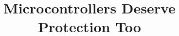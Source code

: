 \documentclass[letterpaper,twocolumn,10pt]{article}
\begin{document}
\date{}

\title{\Large \bf Microcontrollers Deserve Protection Too}


\maketitle








{\footnotesize 
}


\theendnotes
\end{document}
